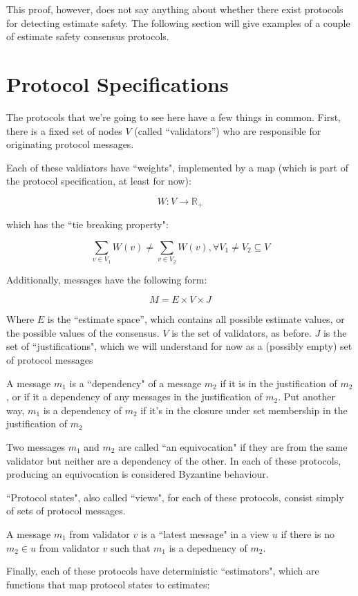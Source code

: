 \documentclass{article}
\theoremstyle{definition}
\begin{document}
This proof, however, does not say anything about whether there exist protocols for detecting estimate safety. The following section will give examples of a couple of estimate safety consensus protocols.

\section{Protocol Specifications}

The protocols that we're going to see here have a few things in common. First, there is a fixed set of nodes $V$ (called ``validators'') who are responsible for originating protocol messages. 

Each of these valdiators have ``weights", implemented by a map (which is part of the protocol specification, at least for now):

$$
W: V \to \mathbb{R}_+
$$

which has the ``tie breaking property":

$$
\sum_{v \in V_1} W(v) \neq \sum_{v \in V_2} W(v), \forall V_1 \neq V_2 \subseteq V
$$

Additionally, messages have the following form:

$$
M = E \times V \times J
$$

Where $E$ is the ``estimate space'', which contains all possible estimate values, or the possible values of the consensus. $V$ is the set of validators, as before. $J$ is the set of ``justifications", which we will understand for now as a (possibly empty) set of protocol messages

A message $m_1$ is a ``dependency" of a message $m_2$ if it is in the justification of $m_2$, or if it a dependency of any messages in the justification of $m_2$. Put another way, $m_1$ is a dependency of $m_2$ if it's in the closure under set membership in the justification of $m_2$

Two messages $m_1$ and $m_2$ are called ``an equivocation" if they are from the same validator but neither are a dependency of the other. In each of these protocols, producing an equivocation is considered Byzantine behaviour.

``Protocol states", also called ``views", for each of these protocols, consist simply of sets of protocol messages. 

A message $m_1$ from validator $v$ is a ``latest message" in a view $u$ if there is no $m_2 \in u$ from validator $v$ such that $m_1$ is a depednency of $m_2$.

Finally, each of these protocols have deterministic ``estimators", which are functions that map protocol states to estimates:
\end{document}

